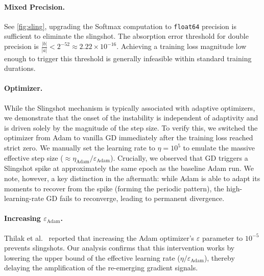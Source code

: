 \documentclass{article}
\theoremstyle{plain}
\theoremstyle{definition}
\theoremstyle{remark}
\begin{document}
\paragraph{Mixed Precision.}
See \cref{fig:sling}, upgrading the Softmax computation to \texttt{float64} precision is sufficient to eliminate the slingshot. The absorption error threshold for double precision is $\frac{|b|}{|a|} < 2^{-52} \approx 2.22 \times 10^{-16}$. Achieving a training loss magnitude low enough to trigger this threshold is generally infeasible within standard training durations.

\paragraph{Optimizer.} While the Slingshot mechanism is typically associated with adaptive optimizers, 
we demonstrate that the onset of the instability is independent of adaptivity and is driven solely by the magnitude of the step size. 
To verify this, we switched the optimizer from Adam to 
vanilla GD immediately after the training loss reached strict zero. 
We manually set the learning rate to $\eta = 10^5$ to emulate the massive effective step size 
($\approx \eta_{\text{Adam}}/\varepsilon_{\text{Adam}}$). 
Crucially, we observed that GD triggers a Slingshot spike at approximately the same epoch as the baseline Adam run. 
We note, however, a key distinction in the aftermath: 
while Adam is able to adapt its moments to recover from the spike (forming the periodic pattern), 
the high-learning-rate GD fails to reconverge, leading to permanent divergence.

\paragraph{Increasing $\varepsilon_{\text{Adam}}$.} 
Thilak et al.~\cite{thilak2022} reported that increasing the Adam optimizer's $\varepsilon$ parameter to $10^{-5}$ prevents slingshots. 
Our analysis confirms that this intervention works by lowering the upper bound of the effective learning rate ($\eta/\varepsilon_{\text{Adam}}$), 
thereby delaying the amplification of the re-emerging gradient signals.
\end{document}
